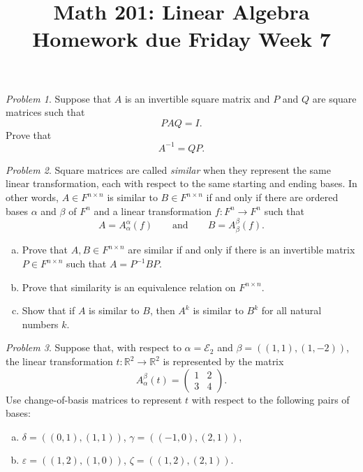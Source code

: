 \documentclass[11pt,twoside]{amsart}
\title{Math 201: Linear Algebra\\ Homework due Friday Week 7}
\theoremstyle{plain}
\theoremstyle{remark}
\newtheorem{prob}{Problem}
\theoremstyle{definition}
\theoremstyle{definition}
\newcommand{\RR}{\mathbb{R}}
\begin{document}
\maketitle

\begin{prob}
Suppose that $A$ is an invertible square matrix and $P$ and $Q$ are square matrices such that
\[
  PAQ = I.
\]
Prove that
\[
  A^{-1} = QP.
\]
\end{prob}

\begin{prob}
Square matrices are called \emph{similar} when they represent the same linear transformation, each with respect to the same starting and ending bases. In other words, $A\in F^{n\times n}$ is similar to $B\in F^{n\times n}$ if and only if there are ordered bases $\alpha$ and $\beta$ of $F^n$ and a linear transformation $f\colon F^n\to F^n$ such that
\[
  A = A_\alpha^\alpha(f)\qquad\text{and}\qquad B = A_{\beta}^\beta(f).
\]
\begin{enumerate}[(a)]
\item Prove that $A, B\in F^{n\times n}$ are similar if and only if there is an invertible matrix $P\in F^{n\times n}$ such that $A = P^{-1}BP$.
\item Prove that similarity is an equivalence relation on $F^{n\times n}$.
\item Show that if $A$ is similar to $B$, then $A^k$ is similar to $B^k$ for all natural numbers $k$.
\end{enumerate}
\end{prob}

\begin{prob}
Suppose that, with respect to $\alpha = \mathcal E_2$ and $\beta = ((1,1),(1,-2))$, the linear transformation $t\colon \RR^2\to \RR^2$ is represented by the matrix
\[
  A_\alpha^\beta(t) =
  \begin{pmatrix}
    1&2 \\ 3&4
  \end{pmatrix}.
\]
Use change-of-basis matrices to represent $t$ with respect to the following pairs of bases:
\begin{enumerate}[(a)]
\item $\delta = ((0,1),(1,1))$, $\gamma = ((-1,0),(2,1))$,
\item $\varepsilon = ((1,2),(1,0))$, $\zeta = ((1,2),(2,1))$.
\end{enumerate}
\end{prob}
\end{document}
